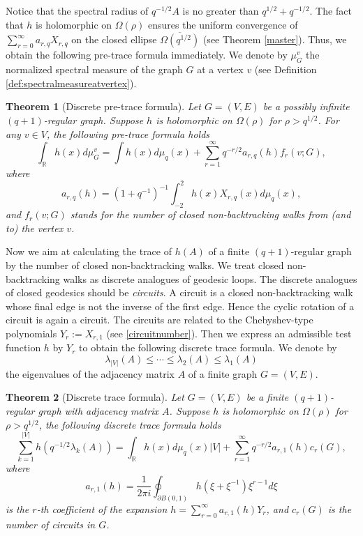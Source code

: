 \documentclass{article}
\newtheorem{introtheorem}{Theorem}
\begin{document}
Notice that the spectral radius of $q^{-1/2}A$ is no greater than $q^{1/2}+q^{-1/2}$.
The fact that $h$ is holomorphic on $\Omega(\rho)$ ensures the uniform convergence of $\sum_{r=0}^{\infty}a_{r,q}X_{r,q}$ on the closed ellipse $\overline{\Omega(q^{1/2})}$ (see Theorem \ref{master}). Thus, we obtain the following pre-trace formula immediately. We denote by $\mu_G^v$ the normalized spectral measure of the graph $G$ at a vertex $v$ (see Definition \ref{def:spectralmeasureatvertex}). 
\begin{introtheorem}[Discrete pre-trace formula]\label{intropretrace}
    Let $G=(V,E)$ be a possibly infinite $(q+1)$-regular graph. Suppose 
    $h$ is holomorphic on $\Omega(\rho)$ for $\rho>q^{1/2}$. For any $v \in V$, the following pre-trace formula holds
    \begin{equation*}
\int_{\mathbb{R}} h(x) d\mu_{G}^{v}=
\int h(x) d\mu_q(x)+\sum_{r=1}^{\infty}q^{-r/2}a_{r,q}(h)f_r(v;G),
\end{equation*}
where $$a_{r,q}(h)=(1+q^{-1})^{-1}\int_{-2}^{2}h(x)X_{r,q}(x)d\mu_q(x),$$
and $f_{r}(v;G)$ stands for the number of closed non-backtracking walks from (and to) the vertex $v$.
\end{introtheorem}
 Now we aim at calculating the trace of $h(A)$ of a finite $(q+1)$-regular graph by the number of closed non-backtracking walks. We treat closed non-backtracking walks as discrete analogues of geodesic loops. The discrete analogues of closed geodesics should be \emph{circuits}. A circuit is a closed non-backtracking walk whose final edge is not the inverse of the first edge. Hence the cyclic rotation of a circuit is again a circuit. The circuits are related to the Chebyshev-type polynomials $Y_{r}:=X_{r,1}$ (see \eqref{circuitnumber}). 
Then we express an admissible test function $h$ by $Y_{r}$ to obtain the following discrete trace formula. We denote by 
\[\lambda_{|V|}(A) \leq \cdots \leq \lambda_2(A) \leq \lambda_1(A)\]
the eigenvalues of the adjacency matrix $A$ of a finite graph $G=(V,E)$.
\begin{introtheorem}[Discrete trace formula]\label{introdiscretetracecircuit}
    Let $G=(V,E)$ be a finite $(q+1)$-regular graph with adjacency matrix $A$. Suppose $h$ is holomorphic on $\Omega(\rho)$ for $\rho>q^{1/2}$,
    the following discrete trace formula holds
    \begin{equation*}\label{discretetraceintro}
\sum_{k=1}^{|V|} h(q^{-1/2}\lambda_k(A))=
\int_{\mathbb{R}} h(x) d\mu_q(x)|V|+\sum_{r=1}^{\infty}q^{-r/2}a_{r,1}(h)c_r(G),
\end{equation*}
    where 
    \begin{equation*}
        a_{r,1}(h)=\frac{1}{2\pi i}\oint_{\partial B(0,1)} h(\xi+\xi^{-1})\xi^{r-1}d\xi
    \end{equation*}
is the $r$-th coefficient of the expansion $h=\sum_{r=0}^\infty a_{r,1}(h)Y_r$, and $c_r(G)$ is the number of circuits in $G$. 
\end{introtheorem}
\end{document}

